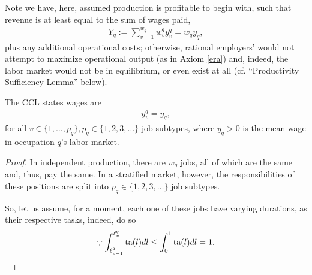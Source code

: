 \documentclass[hidelinks, nonatbib]{elsarticle}
\begin{document}
Note we have, here, assumed production is profitable to begin with, such that revenue is at least equal to the sum of wages paid,
    \begin{gather}
        Y_q
        :=
        \sum_{v=1}^{w_q}
        w_{v}^{q}
        y_{v}^{q}
        =
        w_q
        y_q
        ,
    \end{gather}
plus any additional operational costs; otherwise, rational employers' would not attempt to maximize operational output (as in Axiom \ref{era}) and, indeed, the labor market would not be in equilibrium, or even exist at all (cf. ``Productivity Sufficiency Lemma'' below).

\begin{lemma}
    \label{ccl}
    The CCL states wages are
    \begin{gather}
        y_{v}^{q}
        =
        y_q
        ,
    \end{gather}
    for all $v \in \{1, \dots, p_q\}, p_q \in \{1, 2, 3, \dots\}$ job subtypes, where $y_q > 0 $ is the mean wage in occupation $q$'s labor market.

    \begin{proof}
        In independent production, there are $w_q$ jobs, all of which are the same and, thus, pay the same. In a stratified market, however, the responsibilities of these positions are split into $p_q \in \{1, 2, 3, \dots\}$ job subtypes.
        
        So, let us assume, for a moment, each one of these jobs have varying durations, as their respective tasks, indeed, do so
        \begin{gather}
            \because
            \int_{\ell_{v-1}^{q}}^{\ell_{v}^{q}}
            \text{ta}(l)
            dl
            \leq
            \int_{0}^{1}
            \text{ta}(l)
            dl
            =
            1
            .
        \end{gather}
        

\end{proof}
\end{lemma}
\end{document}

